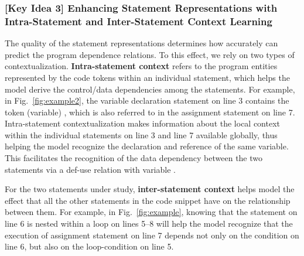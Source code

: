 \subsubsection{{\bf [Key Idea 3] Enhancing Statement Representations with Intra-Statement and Inter-Statement Context Learning}}
The quality of the statement representations determines how accurately
\tool can predict the program dependence relations. To this effect, we
rely on two types of contextualization.
{\bf Intra-statement context} refers to the program entities
represented by the code tokens within an individual statement, which
helps the model derive the control/data dependencies among the
statements. For example, in Fig.~\ref{fig:example2}, the variable
declaration statement on line 3 contains the token (variable)
, which is also referred to in the assignment statement
on line 7. Intra-statement contextualization makes information about
the local context within the individual statements on line 3 and line
7 available globally, thus helping the model recognize the declaration
and reference of the same variable. This facilitates the recognition
of the data dependency between the two statements via a def-use
relation with variable .

For the two statements under study, {\bf inter-statement
  context} helps \tool model the effect that all the other
statements in the code snippet have on the relationship between
them. For example, in Fig.~\ref{fig:example}, knowing that the
 statement on line 6 is nested within a  loop on
lines 5--8 will help the model recognize that the execution of assignment statement on line 7 depends not only on the condition on
line 6, but also on the loop-condition on line 5.
